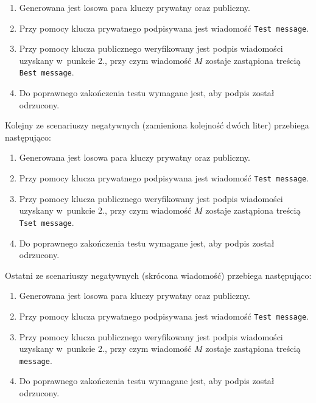 \documentclass{article}
\begin{document}
        \begin{enumerate}
            \item Generowana jest losowa para kluczy prywatny oraz publiczny.
            \item Przy pomocy klucza prywatnego podpisywana jest wiadomość \verb+Test message+.
            \item Przy pomocy klucza publicznego weryfikowany jest podpis wiadomości uzyskany w~punkcie 2., przy czym wiadomość $M$ zostaje zastąpiona treścią \verb+Best message+.
            \item Do poprawnego zakończenia testu wymagane jest, aby podpis został odrzucony.
        \end{enumerate}

        Kolejny ze scenariuszy negatywnych (zamieniona kolejność dwóch liter) przebiega następująco:
        
        \begin{enumerate}
            \item Generowana jest losowa para kluczy prywatny oraz publiczny.
            \item Przy pomocy klucza prywatnego podpisywana jest wiadomość \verb+Test message+.
            \item Przy pomocy klucza publicznego weryfikowany jest podpis wiadomości uzyskany w~punkcie 2., przy czym wiadomość $M$ zostaje zastąpiona treścią \verb+Tset message+.
            \item Do poprawnego zakończenia testu wymagane jest, aby podpis został odrzucony.
        \end{enumerate}        
        
        Ostatni ze scenariuszy negatywnych (skrócona wiadomość) przebiega następująco:
        
        \begin{enumerate}
            \item Generowana jest losowa para kluczy prywatny oraz publiczny.
            \item Przy pomocy klucza prywatnego podpisywana jest wiadomość \verb+Test message+.
            \item Przy pomocy klucza publicznego weryfikowany jest podpis wiadomości uzyskany w~punkcie 2., przy czym wiadomość $M$ zostaje zastąpiona treścią \verb+message+.
            \item Do poprawnego zakończenia testu wymagane jest, aby podpis został odrzucony.
        \end{enumerate}
        
\end{document}
